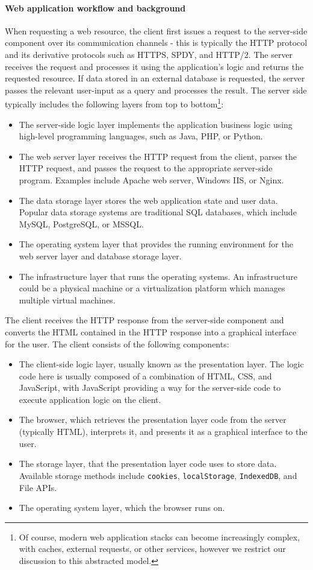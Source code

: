 \paragraph{Web application workflow and background}
When requesting a web resource, the client first issues a request to the server-side component over its communication channels - this is typically the HTTP protocol and its derivative protocols such as HTTPS, SPDY, and HTTP/2.
The server receives the request and processes it using the application's logic and returns the requested resource. If data stored in an external database is requested, the server passes the relevant user-input as a query and processes the result.
The server side typically includes the following layers from top to bottom\footnote{Of course, modern web application stacks can become increasingly complex, with caches, external requests, or other services, however we restrict our discussion to this abstracted model.}:
\begin{itemize}
	\item The server-side logic layer implements the application business logic using high-level programming languages, such as Java, PHP, or Python.
	\item The web server layer receives the HTTP request from the client, parses the HTTP request, and passes the request to the appropriate server-side program. Examples include Apache web server, Windows IIS, or Nginx.
	\item The data storage layer stores the web application state and user data. Popular data storage systems are traditional SQL databases, which include MySQL, PostgreSQL, or MSSQL.
	\item The operating system layer that provides the running environment for the web server layer and database storage layer.
	\item The infrastructure layer that runs the operating systems. An infrastructure could be a physical machine or a virtualization platform which manages multiple virtual machines.
\end{itemize}
The client receives the HTTP response from the server-side component and converts the HTML contained in the HTTP response into a graphical interface for the user.
The client consists of the following components:
\begin{itemize}
	\item The client-side logic layer, usually known as the presentation layer. The logic code here is usually composed of a combination of HTML, CSS, and JavaScript, with JavaScript providing a way for the server-side code to execute application logic on the client.
	\item The browser, which retrieves the presentation layer code from the server (typically HTML), interprets it, and presents it as a graphical interface to the user.
	\item The storage layer, that the presentation layer code uses to store data. Available storage methods include \verb"cookies", \verb"localStorage", \verb"IndexedDB", and File APIs.
	\item The operating system layer, which the browser runs on.
\end{itemize}